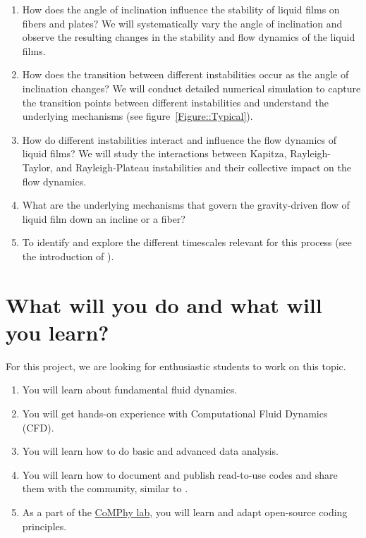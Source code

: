 \documentclass[a4paper,10pt]{article}
\begin{document}
\begin{enumerate}
	\item How does the angle of inclination influence the stability of liquid films on fibers and plates? We will systematically vary the angle of inclination and observe the resulting changes in the stability and flow dynamics of the liquid films.
	
	\item How does the transition between different instabilities occur as the angle of inclination changes? We will conduct detailed numerical simulation to capture the transition points between different instabilities and understand the underlying mechanisms (see figure~\ref{Figure::Typical}). 
	
	\item How do different instabilities interact and influence the flow dynamics of liquid films? We will study the interactions between Kapitza, Rayleigh-Taylor, and Rayleigh-Plateau instabilities and their collective impact on the flow dynamics.
	
	\item What are the underlying mechanisms that govern the gravity-driven flow of liquid film down an incline or a fiber?
		
	\item To identify and explore the different timescales relevant for this process (see the introduction of \citet{VatsalThesis}).
\end{enumerate}

\section*{What will you do and what will you learn?}
For this project, we are looking for enthusiastic students to work on this topic.
\begin{enumerate}
\itemsep0em
\item You will learn about fundamental fluid dynamics.
\item You will get hands-on experience with Computational Fluid Dynamics (CFD).
\item You will learn how to do basic and advanced data analysis.
\item You will learn how to document and publish read-to-use codes and share them with the community, similar to \citet{basiliskVatsal, basiliskVatsalDropFilm, basiliskVatsalViscousBouncing}. 
\item As a part of the \href{https://comphy-lab.org}{CoMPhy lab}, you will learn and adapt open-source coding principles. 

\end{enumerate}
\end{document}
